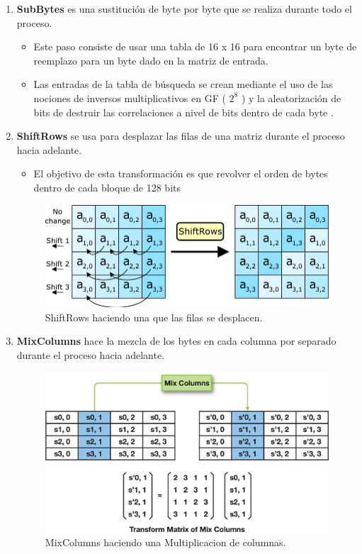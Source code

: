 \documentclass[11pt, conference]{IEEEtran}
\begin{document}
\begin{enumerate}
	\item \textbf{SubBytes} es una sustitución de byte por byte que se realiza durante todo el proceso.
	
	\begin{itemize}
		\item Este paso consiste de usar una tabla de 16 x 16 para encontrar un byte de reemplazo para un byte dado en la matriz de entrada.
		\item Las entradas de la tabla de búsqueda se crean mediante el uso de las nociones
		de inversos multiplicativos en GF ( $2^8$ ) y la aleatorización de bits de
		destruir las correlaciones a nivel de bits dentro de cada byte .
	\end{itemize}
	\item \textbf{ShiftRows} se usa para desplazar las filas de una matriz durante el proceso hacia adelante.
	\begin{itemize}
		\item El objetivo de esta transformación es que revolver el orden de bytes
		dentro de cada bloque de 128 bits
	\end{itemize}
	
	\begin{figure}[h]
		\centering
		\includegraphics[scale=0.25]{ShiftRows.png} 
		\caption{ShiftRows haciendo una que las filas se desplacen.}
	\end{figure}
	\pagebreak
	\item \textbf{MixColumns} hace la mezcla de los bytes en cada columna por separado durante el proceso hacia adelante.
	
	\begin{figure}[h]
		\centering
		\includegraphics[scale=0.6]{MixColumns.jpg} 
		\caption{MixColumns haciendo una Multiplicacion de columnas.}
	\end{figure}
	

\end{enumerate}
\end{document}
